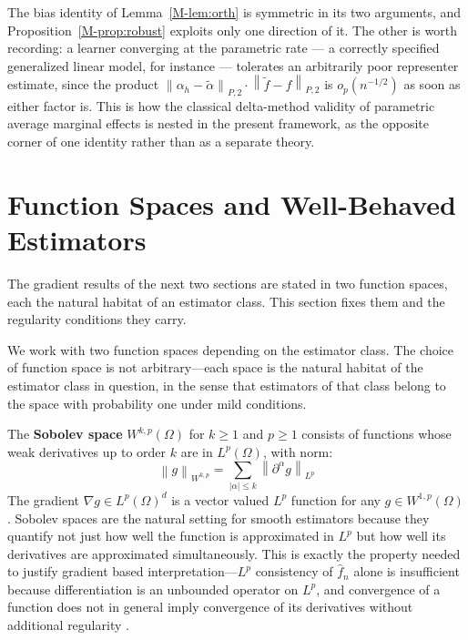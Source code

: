 \documentclass[12pt,a4paper]{article}
\numberwithin{equation}{section}
\theoremstyle{plain}
\theoremstyle{definition}
\newcommand{\norm}[1]{\left\| #1 \right\|}
\newcommand{\Lp}{L^p(\Omega)}
\newcommand{\Wonep}{W^{1,p}(\Omega)}
\newcommand{\fn}{\hat{f}_n}
\newcommand{\Ptwo}[1]{\norm{#1}_{P,2}}
\begin{document}
	The bias identity of Lemma~\ref{M-lem:orth} is symmetric in its two
	arguments, and Proposition~\ref{M-prop:robust} exploits only one direction of
	it. The other is worth recording: a learner converging at the parametric rate
	--- a correctly specified generalized linear model, for instance --- tolerates
	an arbitrarily poor representer estimate, since the product
	$\Ptwo{\alpha_h - \tilde{\alpha}} \cdot \Ptwo{\tilde{f} - f}$ is
	$o_p(n^{-1/2})$ as soon as either factor is. This is how the classical
	delta-method validity of parametric average marginal effects is nested in the
	present framework, as the opposite corner of one identity rather than as a
	separate theory.

	\section{Function Spaces and Well-Behaved Estimators}
	\label{app:spaces}

	The gradient results of the next two sections are stated in two
	function spaces, each the natural habitat of an estimator class.
	This section fixes them and the regularity conditions they carry.

	We work with two function spaces depending on the estimator class. The choice of
	function space is not arbitrary---each space is the natural habitat of the estimator
	class in question, in the sense that estimators of that class belong to the space
	with probability one under mild conditions.
	
	The \textbf{Sobolev space} $W^{k,p}(\Omega)$ for $k \geq 1$ and $p \geq 1$
	consists of functions whose weak derivatives up to order $k$ are in $\Lp$, with
	norm:
	\begin{equation}
		\norm{g}_{W^{k,p}} = \sum_{|\alpha| \leq k} \norm{\partial^\alpha g}_{L^p}
	\end{equation}
	The gradient $\nabla g \in L^p(\Omega)^d$ is a vector valued $L^p$ function for any
	$g \in \Wonep$. Sobolev spaces are the natural setting for smooth estimators because
	they quantify not just how well the function is approximated in $L^p$ but how well
	its derivatives are approximated simultaneously. This is exactly the property needed
	to justify gradient based interpretation---$L^p$ consistency of $\fn$ alone is
	insufficient because differentiation is an unbounded operator on $L^p$, and
	convergence of a function does not in general imply convergence of its derivatives
	without additional regularity \citep[Chapter~5]{evans2010pde}.
	
\end{document}
